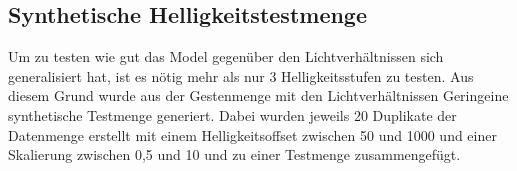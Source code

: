\subsection{Synthetische Helligkeitstestmenge}
Um zu testen wie gut das Model gegenüber den Lichtverhältnissen sich generalisiert hat, ist es nötig mehr als nur 3 Helligkeitsstufen zu testen. Aus diesem Grund wurde aus der Gestenmenge mit den Lichtverhältnissen
\glqq Gering\grqq eine synthetische Testmenge generiert. Dabei wurden jeweils 20 Duplikate der Datenmenge erstellt mit einem Helligkeitsoffset zwischen 50 und 1000 und einer Skalierung zwischen 0,5 und 10 und zu
einer Testmenge zusammengefügt.